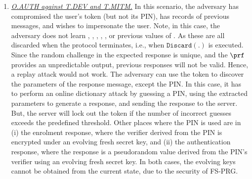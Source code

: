 \begin{enumerate}[leftmargin=5mm]
\item\underline{\textit{O.AUTH against T.DEV and T.MITM.}}\label{O.AUTH:T.DEV-plus-T.MITM}
In this scenario, the adversary has compromised the user's token (but not its PIN), has records of previous messages, and wishes to impersonate the user. Note, in this case, the adversary does not learn \VC{\verifier}, \VM{\trans}, \VC{\pin}, , ,  or previous values of \VC{\state}. As these are all discarded when the protocol terminates, i.e., when $\mathtt{Discard}(.)$ is executed. 
%
Since the random challenge in the expected response is unique, and the $\prf$ provides an unpredictable output, previous responses will not be valid. Hence, a replay attack would not work. The adversary can use the token to discover the parameters of the response message, except the PIN. In this case, it has to perform an online dictionary attack by guessing a PIN, using the extracted parameters to generate a response, and sending the response to the server. But, the server will lock out the token if the number of incorrect guesses exceeds the predefined threshold. Other places where the PIN is used are in (i) the enrolment response, where the verifier derived from the PIN is encrypted under an evolving fresh secret key, and (ii) the authentication response, where the response is a pseudorandom value derived from the PIN's verifier using an evolving fresh secret key. In both cases, the evolving keys cannot be obtained from the current state, due to the security of FS-PRG. 




\end{enumerate}
